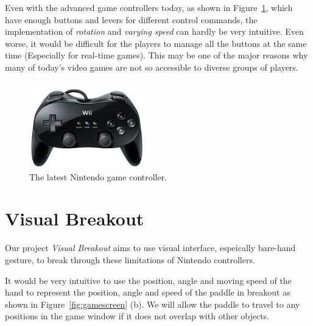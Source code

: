 \documentclass[10pt,twocolumn,letterpaper]{article}
\begin{document}
Even with the advanced game controllers today, as shown in 
Figure~\ref{fig:newgamestick}, which have enough buttons 
and levers for different control commands, the implementation 
of \emph{rotation} and \emph{varying speed} can hardly be very 
intuitive. Even worse, it would be difficult for the players to 
manage all the buttons at the same time (Especially for real-time 
games). This may be one of the major reasons why many of today's 
video games are not so accessible to diverse groups of players.

\begin{figure}[h]
\centering
\includegraphics[width=5cm]{pics/stick.png}
\caption{The latest Nintendo game controller.}
\label{fig:newgamestick}
\end{figure}


\section{Visual Breakout}
Our project \emph{Visual Breakout} aims to use 
visual interface, espeically bare-hand gesture, to break 
through these limitations of Nintendo controllers. 

It would be very intuitive to use the position, 
angle and moving speed of the hand to represent 
the position, angle and speed of the paddle in 
breakout as shown in Figure~\ref{fig:gamescreen} (b). 
We will allow the paddle 
to travel to any positions in the game window if 
it does not overlap with other objects.
\end{document}
